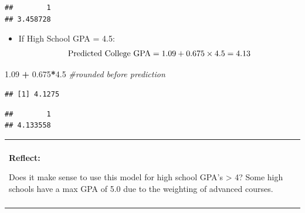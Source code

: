 \documentclass[
]{book}
\newenvironment{Shaded}{\begin{snugshade}}{\end{snugshade}}
\newcommand{\CommentTok}[1]{\textcolor[rgb]{0.56,0.35,0.01}{\textit{#1}}}
\newcommand{\DataTypeTok}[1]{\textcolor[rgb]{0.13,0.29,0.53}{#1}}
\newcommand{\FloatTok}[1]{\textcolor[rgb]{0.00,0.00,0.81}{#1}}
\newcommand{\KeywordTok}[1]{\textcolor[rgb]{0.13,0.29,0.53}{\textbf{#1}}}
\newcommand{\NormalTok}[1]{#1}
\newcommand{\OperatorTok}[1]{\textcolor[rgb]{0.81,0.36,0.00}{\textbf{#1}}}
\newcommand{\StringTok}[1]{\textcolor[rgb]{0.31,0.60,0.02}{#1}}
\providecommand{\tightlist}{%
  \setlength{\itemsep}{0pt}\setlength{\parskip}{0pt}}
\newenvironment{reflect}
{
    \begin{center}
    
    \begin{tabular}{|p{0.8\textwidth}|}
    \rowcolor{LightBlue}
    \hline\\
    \rowcolor{LightBlue}
    \textbf{Reflect:}
}
{
    \\\rowcolor{LightBlue}
    \\\hline
    \end{tabular} 
    \end{center}
}
\begin{document}
\begin{Shaded}
\end{Shaded}

\begin{verbatim}
##        1 
## 3.458728
\end{verbatim}

\begin{itemize}
\tightlist
\item
  If High School GPA = 4.5:\\
  \[ \hbox{Predicted College GPA} = 1.09 + 0.675 \times 4.5 = 4.13 \]
\end{itemize}

\begin{Shaded}
\begin{Highlighting}[]
\FloatTok{1.09} \OperatorTok{+}\StringTok{ }\FloatTok{0.675}\OperatorTok{*}\FloatTok{4.5} \CommentTok{#rounded before prediction}
\end{Highlighting}
\end{Shaded}

\begin{verbatim}
## [1] 4.1275
\end{verbatim}

\begin{Shaded}
\end{Shaded}

\begin{verbatim}
##        1 
## 4.133558
\end{verbatim}

\begin{reflect}
Does it make sense to use this model for high school GPA's
\textgreater{} 4? Some high schools have a max GPA of 5.0 due to the
weighting of advanced courses.
\end{reflect}
\end{document}
